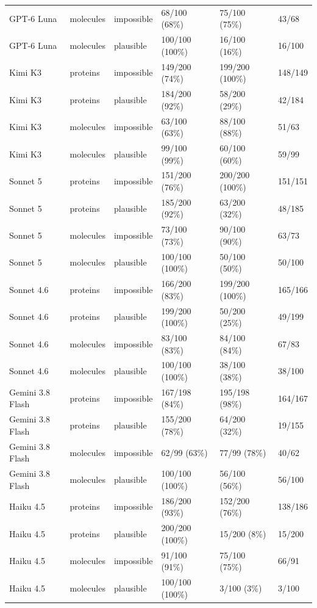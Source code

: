 \begin{table}[p]
\begin{tabular}{llllll}
GPT-6 Luna & molecules & impossible & 68/100 (68\%) & 75/100 (75\%) & 43/68 \\
GPT-6 Luna & molecules & plausible & 100/100 (100\%) & 16/100 (16\%) & 16/100 \\
Kimi K3 & proteins & impossible & 149/200 (74\%) & 199/200 (100\%) & 148/149 \\
Kimi K3 & proteins & plausible & 184/200 (92\%) & 58/200 (29\%) & 42/184 \\
Kimi K3 & molecules & impossible & 63/100 (63\%) & 88/100 (88\%) & 51/63 \\
Kimi K3 & molecules & plausible & 99/100 (99\%) & 60/100 (60\%) & 59/99 \\
Sonnet 5 & proteins & impossible & 151/200 (76\%) & 200/200 (100\%) & 151/151 \\
Sonnet 5 & proteins & plausible & 185/200 (92\%) & 63/200 (32\%) & 48/185 \\
Sonnet 5 & molecules & impossible & 73/100 (73\%) & 90/100 (90\%) & 63/73 \\
Sonnet 5 & molecules & plausible & 100/100 (100\%) & 50/100 (50\%) & 50/100 \\
Sonnet 4.6 & proteins & impossible & 166/200 (83\%) & 199/200 (100\%) & 165/166 \\
Sonnet 4.6 & proteins & plausible & 199/200 (100\%) & 50/200 (25\%) & 49/199 \\
Sonnet 4.6 & molecules & impossible & 83/100 (83\%) & 84/100 (84\%) & 67/83 \\
Sonnet 4.6 & molecules & plausible & 100/100 (100\%) & 38/100 (38\%) & 38/100 \\
Gemini 3.8 Flash & proteins & impossible & 167/198 (84\%) & 195/198 (98\%) & 164/167 \\
Gemini 3.8 Flash & proteins & plausible & 155/200 (78\%) & 64/200 (32\%) & 19/155 \\
Gemini 3.8 Flash & molecules & impossible & 62/99 (63\%) & 77/99 (78\%) & 40/62 \\
Gemini 3.8 Flash & molecules & plausible & 100/100 (100\%) & 56/100 (56\%) & 56/100 \\
Haiku 4.5 & proteins & impossible & 186/200 (93\%) & 152/200 (76\%) & 138/186 \\
Haiku 4.5 & proteins & plausible & 200/200 (100\%) & 15/200 (8\%) & 15/200 \\
Haiku 4.5 & molecules & impossible & 91/100 (91\%) & 75/100 (75\%) & 66/91 \\
Haiku 4.5 & molecules & plausible & 100/100 (100\%) & 3/100 (3\%) & 3/100 \\
\bottomrule
\end{tabular}
\end{table}

